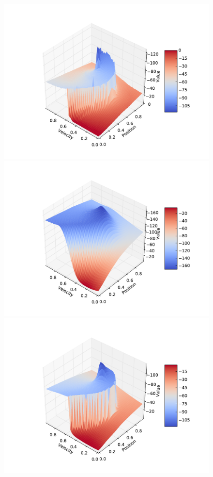 \documentclass{article} %
\begin{document}
\begin{figure}[!htb]
    \includegraphics[width=\linewidth]{./figs/mctru.pdf}
  \endminipage
    \includegraphics[width=\linewidth]{./figs/mc1.pdf}
  \endminipage\hfill
    \includegraphics[width=\linewidth]{./figs/mc4.pdf}

\end{figure}
\end{document}
